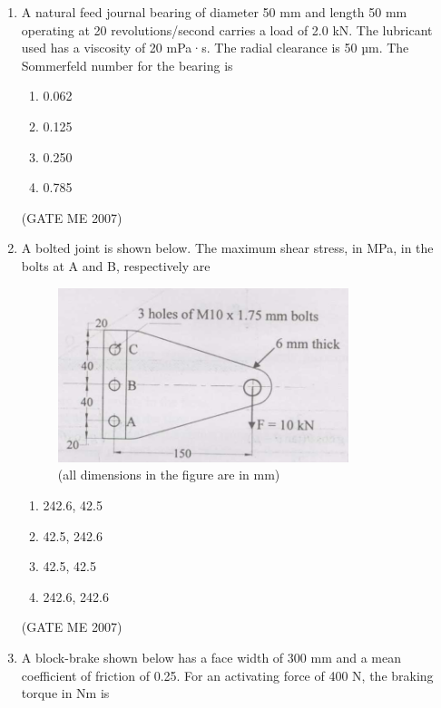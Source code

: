 \documentclass[journal]{IEEEtran}
\begin{document}
\begin{enumerate}
\item A natural feed journal bearing of diameter 50 mm and length 50 mm operating at 20 revolutions/second carries a load of 2.0 kN. The lubricant used has a viscosity of 20 mPa·s. The radial clearance is 50 µm. The Sommerfeld number for the bearing is
\begin{multicols}{4}
\begin{enumerate}
\item 0.062
\item 0.125
\item 0.250
\item 0.785
\end{enumerate}
\end{multicols}
\hfill (GATE ME 2007)

\item A bolted joint is shown below. The maximum shear stress, in MPa, in the bolts at A and B, respectively are

\begin{figure}[H]
    \centering
    \includegraphics[width=0.8\textwidth]{Fig 5.png}
    \caption{(all dimensions in the figure are in mm)}
    \label{fig:question48}
\end{figure}

\begin{multicols}{2}
\begin{enumerate}
\item 242.6, 42.5
\item 42.5, 242.6
\item 42.5, 42.5
\item 242.6, 242.6
\end{enumerate}
\end{multicols}
\hfill (GATE ME 2007)

\item A block-brake shown below has a face width of 300 mm and a mean coefficient of friction of 0.25. For an activating force of 400 N, the braking torque in Nm is


\end{enumerate}
\end{document}
